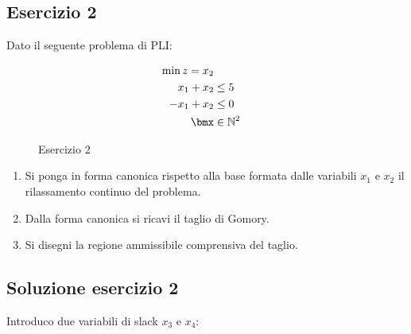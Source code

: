 \documentclass[\main/main.tex]{subfiles}
\begin{document}
\subsection{Esercizio 2}
Dato il seguente problema di PLI:

\begin{figure}
  \begin{align*}
    \min z = x_2                  \\
    x_1 + x_2  & \leq 5           \\
    -x_1 + x_2 & \leq 0           \\
    \bmx       & \in \mathbb{N}^2
  \end{align*}
  \caption{Esercizio 2}
\end{figure}

\begin{enumerate}
  \item Si ponga in forma canonica rispetto alla base formata dalle variabili $x_1$ e $x_2$ il rilassamento continuo del problema.
  \item Dalla forma canonica si ricavi il taglio di Gomory.
  \item Si disegni la regione ammissibile comprensiva del taglio.
\end{enumerate}

\subsection{Soluzione esercizio 2}
Introduco due variabili di slack $x_3$ e $x_4$:
\end{document}
